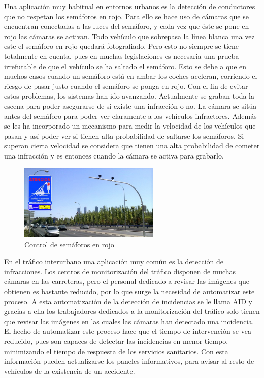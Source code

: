 Una aplicación muy habitual en entornos urbanos es la detección de conductores que no respetan los semáforos en rojo. Para ello se   hace uso de cámaras que se encuentran conectadas a las luces del semáforo, y cada vez que éste se pone en rojo las cámaras se activan. Todo vehículo que sobrepasa la línea blanca una vez este el semáforo en rojo quedará fotografiado. Pero esto no siempre se tiene totalmente en cuenta, pues en muchas legislaciones es necesaria una prueba irrefutable de que el vehículo se ha saltado el semáforo. Esto se debe a que en muchos casos cuando un semáforo está en ambar los coches aceleran, corriendo el riesgo de pasar justo cuando el semáforo se ponga en rojo. Con el fin de evitar estos problemas, los sistemas han ido avanzando. Actualmente se graban toda la escena para poder asegurarse de si existe una infracción o no. La cámara se sitúa antes del semáforo para poder ver claramente a los vehículos infractores. Además se les ha incorporado un mecanismo para medir la velocidad de los vehículos que pasan y así poder ver si tienen alta probabilidad de saltarse los semáforos. Si superan cierta velocidad se considera que tienen una alta probabilidad de cometer una infracción y es entonces cuando la cámara se activa para grabarlo.
\begin{figure}[H]
  \begin{center}
    \includegraphics[width=0.6\textwidth]{figures/Introduccion/control_semaforo.jpg}
		\caption{Control de semáforos en rojo}
		\label{fig.control_semaforos}
		\end{center}
\end{figure}
En el tráfico interurbano una aplicación muy común es la detección de infracciones. Los centros de monitorización del tráfico disponen de muchas cámaras en las carreteras, pero el personal dedicado a revisar las imágenes que obtienen es bastante reducido, por lo que surge la necesidad de automatizar este proceso. A esta automatización de la detección de incidencias se le llama AID  y gracias a ella los trabajadores dedicados  a la monitorización del tráfico solo tienen que revisar las imágenes en las  cuales las cámaras han detectado una incidencia. El hecho de automatizar este proceso hace que el tiempo de intervención se vea reducido, pues son capaces de detectar las incidencias en menor tiempo, minimizando el tiempo de respuesta de los servicios sanitarios. Con esta información pueden actualizarse los paneles informativos, para avisar al resto de vehículos de la existencia de un accidente.

